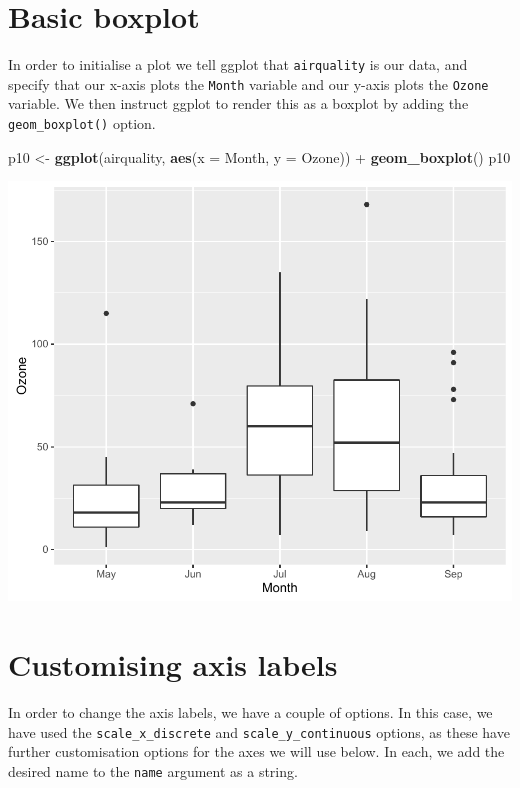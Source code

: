 \documentclass[]{article}
\newenvironment{Shaded}{\begin{snugshade}}{\end{snugshade}}
\newcommand{\KeywordTok}[1]{\textcolor[rgb]{0.13,0.29,0.53}{\textbf{{#1}}}}
\newcommand{\DataTypeTok}[1]{\textcolor[rgb]{0.13,0.29,0.53}{{#1}}}
\newcommand{\StringTok}[1]{\textcolor[rgb]{0.31,0.60,0.02}{{#1}}}
\newcommand{\NormalTok}[1]{{#1}}
\begin{document}
\section{Basic boxplot}\label{basic-boxplot}

In order to initialise a plot we tell ggplot that \texttt{airquality} is
our data, and specify that our x-axis plots the \texttt{Month} variable
and our y-axis plots the \texttt{Ozone} variable. We then instruct
ggplot to render this as a boxplot by adding the
\texttt{geom\_boxplot()} option.

\begin{Shaded}
\begin{Highlighting}[]
\NormalTok{p10 <-}\StringTok{ }\KeywordTok{ggplot}\NormalTok{(airquality, }\KeywordTok{aes}\NormalTok{(}\DataTypeTok{x =} \NormalTok{Month, }\DataTypeTok{y =} \NormalTok{Ozone)) +}\StringTok{ }
\StringTok{  }\KeywordTok{geom_boxplot}\NormalTok{()}
\NormalTok{p10}
\end{Highlighting}
\end{Shaded}

\begin{center}\includegraphics{10_Boxplots_pdf/box_1-1} \end{center}

\section{Customising axis labels}\label{customising-axis-labels}

In order to change the axis labels, we have a couple of options. In this
case, we have used the \texttt{scale\_x\_discrete} and
\texttt{scale\_y\_continuous} options, as these have further
customisation options for the axes we will use below. In each, we add
the desired name to the \texttt{name} argument as a string.
\end{document}

